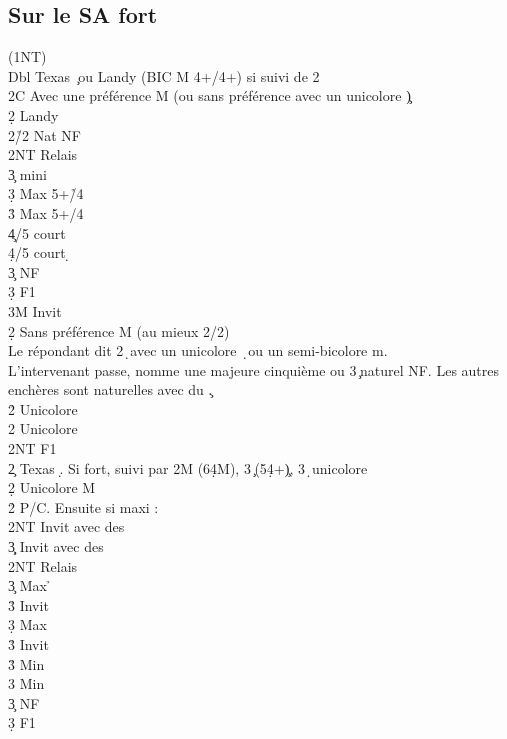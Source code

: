 \documentclass[a4paper]{article}
\begin{document}
\subsection{Sur le SA fort}

\begin{bidtable}
(1NT)\+\\
Dbl \> Texas \c\ ou Landy (BIC M 4+/4+) si suivi de 2\d \\
\>2C Avec une préférence M (ou sans préférence avec un unicolore \c )\+\\
2\d \> Landy\+\\
2\h/2\s \> Nat NF\\
2NT \> Relais\+\\
3\c \> mini\\
3\d \> Max 5+\h /4\s \\
3\h \> Max 5+\s /4\h \\
4\c {}/5 court \c \\
4\d {}/5 court \d \-\\
3\c \> NF\\
3\d \> F1\\
3M \> Invit\-\\
2\d \> Sans préférence M (au mieux 2/2)\\
\>Le répondant dit 2\d\ avec un unicolore \d\ ou un semi-bicolore m. \\
\>L'intervenant passe, nomme une majeure cinquième ou 3\c\ naturel NF. Les autres enchères sont naturelles avec du \c .\\
2\h \> Unicolore\\
2\s \> Unicolore\\
2NT \> F1\-\\
2\c \> Texas \d . Si fort, suivi par 2M (6\d 4M), 3\c\ (5\d 4+\c ), 3\d\ unicolore\\
2\d \> Unicolore M\+\\
2\h\s \> P/C. Ensuite si maxi :\+\\
2NT \> Invit avec des \h \\
3\c\d \> Invit avec des \s \-\\
2NT \> Relais\+\\
3\c \> Max \h \+\\
3\h\s \> Invit\-\\
3\d \> Max \s \+\\
3\h\s \> Invit\-\\
3\h \> Min \h \\
3\s \> Min \s \-\\
3\c \> NF\\
3\d \> F1\\

\end{bidtable}
\end{document}
